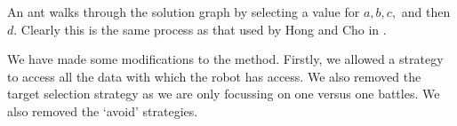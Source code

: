 An ant walks through the solution graph by selecting a value for $a, b, c,$ and then $d$. Clearly this is the same process as that used by Hong and Cho in \cite{emergentbehaviours}.

We have made some modifications to the method. Firstly, we allowed a strategy to access all the data with which the robot has access. We also removed the target selection strategy as we are only focussing on one versus one battles. We also removed the `avoid' strategies.


